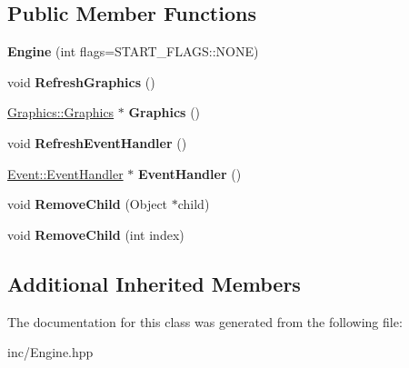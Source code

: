 \subsection*{Public Member Functions}
\begin{DoxyCompactItemize}
\item 
\hypertarget{class_aspen_1_1_engine_1_1_engine_ac247ab960080cb55b3b3a6202d91259a}{{\bfseries Engine} (int flags=S\-T\-A\-R\-T\-\_\-\-F\-L\-A\-G\-S\-::\-N\-O\-N\-E)}\label{class_aspen_1_1_engine_1_1_engine_ac247ab960080cb55b3b3a6202d91259a}

\item 
\hypertarget{class_aspen_1_1_engine_1_1_engine_afb12d005248a08442a76c2fffd1ad080}{void {\bfseries Refresh\-Graphics} ()}\label{class_aspen_1_1_engine_1_1_engine_afb12d005248a08442a76c2fffd1ad080}

\item 
\hypertarget{class_aspen_1_1_engine_1_1_engine_a14d74ed385c359ecb771843b4af54f21}{\hyperlink{class_aspen_1_1_graphics_1_1_graphics}{Graphics\-::\-Graphics} $\ast$ {\bfseries Graphics} ()}\label{class_aspen_1_1_engine_1_1_engine_a14d74ed385c359ecb771843b4af54f21}

\item 
\hypertarget{class_aspen_1_1_engine_1_1_engine_ad89a5fe88e9424fa67ce36b764dc55b3}{void {\bfseries Refresh\-Event\-Handler} ()}\label{class_aspen_1_1_engine_1_1_engine_ad89a5fe88e9424fa67ce36b764dc55b3}

\item 
\hypertarget{class_aspen_1_1_engine_1_1_engine_a9e5adc83ecc59c18a27da85e4d7b7653}{\hyperlink{class_aspen_1_1_event_1_1_event_handler}{Event\-::\-Event\-Handler} $\ast$ {\bfseries Event\-Handler} ()}\label{class_aspen_1_1_engine_1_1_engine_a9e5adc83ecc59c18a27da85e4d7b7653}

\item 
\hypertarget{class_aspen_1_1_engine_1_1_engine_ab357ce5c8feff1fc480a3db4173ae835}{void {\bfseries Remove\-Child} (Object $\ast$child)}\label{class_aspen_1_1_engine_1_1_engine_ab357ce5c8feff1fc480a3db4173ae835}

\item 
\hypertarget{class_aspen_1_1_engine_1_1_engine_a2a77300f19cece8e61a52ed4cc1526fe}{void {\bfseries Remove\-Child} (int index)}\label{class_aspen_1_1_engine_1_1_engine_a2a77300f19cece8e61a52ed4cc1526fe}

\end{DoxyCompactItemize}
\subsection*{Additional Inherited Members}


The documentation for this class was generated from the following file\-:\begin{DoxyCompactItemize}
\item 
inc/Engine.\-hpp\end{DoxyCompactItemize}
